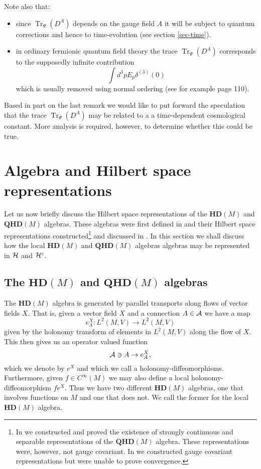 \documentclass[12pt]{article}
\def\d{\delta}
\def\ca{{\cal A}}
\def\ch{{\cal H}}
\newcommand{\Tr}{\operatorname{Tr}}
\begin{document}
Note also that:
\begin{itemize}
\item
since $\Tr_\Psi (D^A)$ depends on the gauge field $A$ it will be subject to quantum corrections and hence to time-evolution (see section \ref{sec-time}).
\item
in ordinary fermionic quantum field theory the trace $\Tr_\Psi (D^A)$ corresponds to the supposedly infinite contribution
$$
\int d^3 p E_p \d^{(3)}(0)  
$$
 which is usually removed using normal ordering (see for example \cite{Tong} page 110). 
\end{itemize}
Based in part on the last remark we would like to put forward the speculation that the trace $\Tr_\Psi (D^A)$ may be related to a a time-dependent cosmological constant. More analysis is required, however, to determine whether this could be true.





\section{Algebra and Hilbert space representations}
\label{sechilbert}



Let us now briefly discuss the Hilbert space representations of the $\mathbf{HD}(M)$ and $\mathbf{QHD}(M)$ algebras. These algebras were first defined in \cite{Aastrup:2012vq,AGnew,Aastrup:2014ppa} and their Hilbert space representations constructed\footnote{In \cite{Aastrup:2017vrm} we constructed and proved the existence of strongly continuous and separable representations of the $\mathbf{QHD}(M)$ algebra. These representations were, however, not gauge covariant. In \cite{Aastrup:2019yui} we constructed gauge covariant representations but were unable to prove convergence.} and discussed in \cite{Aastrup:2019yui,Aastrup:2017vrm}. In this section we shall discuss how the local $\mathbf{HD}(M)$ and $\mathbf{QHD}(M)$ algebras algebras may be represented in $\ch$ and $\ch^c$.

\subsection{The $\mathbf{HD}(M)$ and $\mathbf{QHD}(M)$ algebras}

The $\mathbf{HD}(M)$ algebra is generated by parallel transports along flows of vector fields $X$. That is, given a vector field $X$ and a connection $A\in\ca$ we have a map 
$$
e^X_A : L^2(M,V)\rightarrow L^2(M,V)
$$
given by the holonomy transform of elements in $L^2(M,V)$ along the flow of $X$. This then gives us an operator valued function 
$$
\ca \ni A \rightarrow e^X_A,
$$
which we denote by $e^X$ and which we call a holonomy-diffeomorphisms.
Furthermore, given $f\in C^\infty(M)$ we may also define a local holonomy-diffeomorphism $f e^X$. Thus we have two different $\mathbf{HD}(M)$ algebras, one that involves functions on $M$ and one that does not. We call the former for the local $\mathbf{HD}(M)$ algebra.
\end{document}
